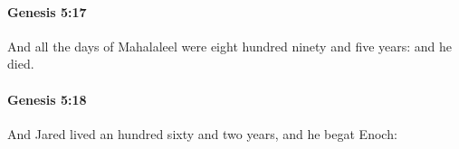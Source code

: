 		\paragraph{Genesis 5:17} %
			\label{GENESIS-5-17}

			And all the days of Mahalaleel were eight hundred ninety and five years: and he died.


		\paragraph{Genesis 5:18} %
			\label{GENESIS-5-18}

			And Jared lived an hundred sixty and two years, and he begat Enoch:


